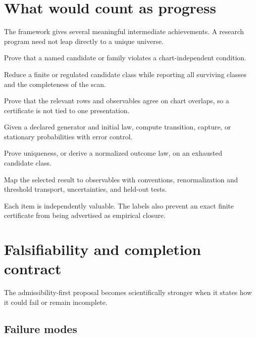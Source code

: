 \documentclass[11pt]{article}
\theoremstyle{definition}
\theoremstyle{remark}
\newcommand{\1}{\mathbf 1}
\begin{document}
\section{What would count as progress}
\label{sec:progress}

The framework gives several meaningful intermediate achievements.  A
research program need not leap directly to a unique universe.

\begin{description}[leftmargin=3.2cm,style=nextline]
\item[Certified exclusion]
Prove that a named candidate or family violates a chart-independent
condition.

\item[Controlled reduction]
Reduce a finite or regulated candidate class while reporting all surviving
classes and the completeness of the scan.

\item[Atlas transfer]
Prove that the relevant rows and observables agree on chart overlaps, so a
certificate is not tied to one presentation.

\item[Conditional dynamics]
Given a declared generator and initial law, compute transition, capture, or
stationary probabilities with error control.

\item[Selection theorem]
Prove uniqueness, or derive a normalized outcome law, on an exhausted
candidate class.

\item[Empirical closure]
Map the selected result to observables with conventions, renormalization
and threshold transport, uncertainties, and held-out tests.
\end{description}

Each item is independently valuable.  The labels also prevent an exact
finite certificate from being advertised as empirical closure.

\section{Falsifiability and completion contract}
\label{sec:completion}

The admissibility-first proposal becomes scientifically stronger when it
states how it could fail or remain incomplete.

\subsection{Failure modes}
\end{document}
